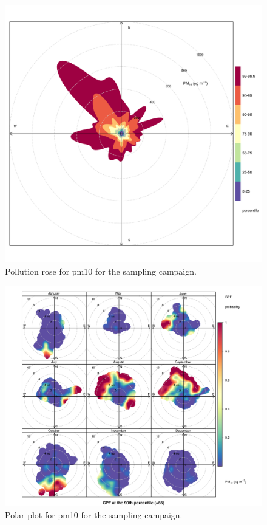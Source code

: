 \documentclass{nwureport}
\begin{document}
\begin{figure}[!htb]
    \centering
    \includegraphics[width=\textwidth]{images/Wedela_PM10_percentileRose.png}
    \caption[Pollution rose for $PM_{10}$ for the sampling campaign.]{Pollution rose for \gls{pm10} for the sampling campaign.}
    \label{fig:summary}
\end{figure}

\begin{figure}[!htb]
    \centering
    \includegraphics[width=\textwidth]{images/Wedela_PM10_polar.png}
    \caption[Polar plot for $PM_{10}$ for the sampling campaign.]{Polar plot for \gls{pm10} for the sampling campaign.}
    \label{fig:summary}
\end{figure}
\end{document}
